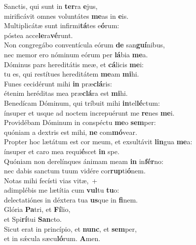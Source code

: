 \evenverse Sanctis, qui sunt in \textbf{ter}ra \textbf{e}jus,~\*\\
\evenverse mirificávit omnes voluntátes \textbf{me}as in \textbf{e}is.\\
\oddverse Multiplicátæ sunt infirmi\textbf{tá}tes e\textbf{ó}rum:~\*\\
\oddverse póstea acce\textbf{le}ra\textbf{vé}runt.\\
\evenverse Non congregábo conventícula eórum \textbf{de} san\textbf{guí}nibus,~\*\\
\evenverse nec memor ero nóminum eórum per \textbf{lá}bia \textbf{me}a.\\
\oddverse Dóminus pars hereditátis meæ, et \textbf{cá}licis \textbf{me}i:~\*\\
\oddverse tu es, qui restítues hereditátem \textbf{me}am \textbf{mi}hi.\\
\evenverse Funes cecidérunt mihi \textbf{in} præ\textbf{clá}ris:~\*\\
\evenverse étenim heréditas mea præ\textbf{clá}ra est \textbf{mi}hi.\\
\oddverse Benedícam Dóminum, qui tríbuit mihi \textbf{in}tel\textbf{lé}ctum:~\*\\
\oddverse ínsuper et usque ad noctem increpuérunt me \textbf{re}nes \textbf{me}i.\\
\evenverse Providébam Dóminum in conspéctu \textbf{me}o \textbf{sem}per:~\*\\
\evenverse quóniam a dextris est mihi, \textbf{ne} com\textbf{mó}vear.\\
\oddverse Propter hoc lætátum est cor meum, et exsultávit \textbf{lin}gua \textbf{me}a:~\*\\
\oddverse ínsuper et caro mea requi\textbf{é}scet \textbf{in} spe.\\
\evenverse Quóniam non derelínques ánimam meam \textbf{in} in\textbf{fér}no:~\*\\
\evenverse nec dabis sanctum tuum vidére cor\textbf{rup}ti\textbf{ó}nem.\\
\oddverse Notas mihi fecísti vias vitæ,~+\\
\oddverse  adimplébis me lætítia cum \textbf{vul}tu \textbf{tu}o:~\*\\
\oddverse delectatiónes in déxtera tua \textbf{us}que in \textbf{fi}nem.\\
\evenverse Glória \textbf{Pa}tri, et \textbf{Fí}lio,~\*\\
\evenverse et Spi\textbf{rí}tui \textbf{San}cto.\\
\oddverse Sicut erat in princípio, et \textbf{nunc}, et \textbf{sem}per,~\*\\
\oddverse et in sǽcula sæcu\textbf{ló}rum. \textbf{A}men.\\
